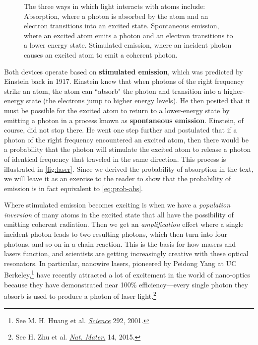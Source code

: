 \begin{figure}[!h]
	\centering
	 \qquad 
	 \qquad 
	\caption{The three ways in which light interacts with atoms include: \protect{} Absorption, where a photon is absorbed by the atom and an electron transitions into an excited state. \protect{} Spontaneous emission, where an excited atom emits a photon and an electron transitions to a lower energy state. \protect{} Stimulated emission, where an incident photon causes an excited atom to emit a coherent photon.}
	\label{fig:laser}
\end{figure}

Both devices operate based on \textbf{stimulated emission}, which was predicted by Einstein back in 1917. 
Einstein knew that when photons of the right frequency strike an atom, the atom can ``absorb" the photon and transition into a higher-energy state (the electrons jump to higher energy levels). 
He then posited that it must be possible for the excited atom to return to a lower-energy state by emitting a photon in a process known as \textbf{spontaneous emission}. 
Einstein, of course, did not stop there. 
He went one step further and postulated that if a photon of the right frequency encountered an excited atom, then there would be a probability that the photon will stimulate the excited atom to release a photon of identical frequency that traveled in the same direction. 
This process is illustrated in \autoref{fig:laser}. 
Since we derived the probability of absorption in the text, we will leave it as an exercise to the reader to show that the probability of emission is in fact equivalent to \autoref{eq:prob-abs}.

Where stimulated emission becomes exciting is when we have a \emph{population inversion} of many atoms in the excited state that all have the possibility of emitting coherent radiation. 
Then we get an \emph{amplification} effect where a single incident photon leads to two resulting photons, which then turn into four photons, and so on in a chain reaction. 
This is the basis for how masers and lasers function, and scientists are getting increasingly creative with these optical resonators. 
In particular, nanowire lasers, pioneered by Peidong Yang at UC Berkeley,\footnote{See M. H. Huang et al. \href{http://science.sciencemag.org/content/292/5523/1897.full}{\emph{Science}} 292, 2001.} have recently attracted a lot of excitement in the world of nano-optics because they have demonstrated near 100\% efficiency---every single photon they absorb is used to produce a photon of laser light.\footnote{See H. Zhu et al. \href{http://www.nature.com/nmat/journal/v14/n6/full/nmat4271.html}{\emph{Nat. Mater.}} 14, 2015.}


